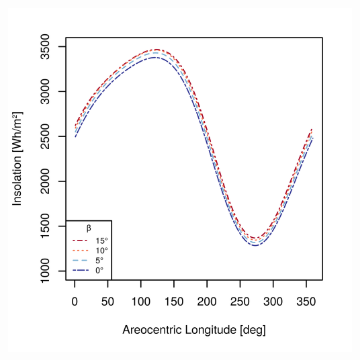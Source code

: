 \begin{figure}[h]
\captionsetup[subfigure]{justification=centering}
\vspace{-2ex}
\centering
    \setlength{\subfigureWidth}{0.50\textwidth}
    \setlength{\graphicsHeight}{80mm}
    \hypersetup{hidelinks=true}%
    \begin{subfigure}[t]{\subfigureWidth}
        \centering
            \includegraphics[height=\graphicsHeight]{sections/mars-solar-energy/solar-radiation/plots/ismenius-cavus-solar-insolations-for-different-beta-inclinations-at-tau-factor-1.png}
            \label{fig:plot:sub:diurnal-insolation-variations-inclined-surface-tau-1}
    \end{subfigure}\hfill
    \begin{subfigure}[t]{\subfigureWidth}
        \centering

\end{subfigure}
\end{figure}
